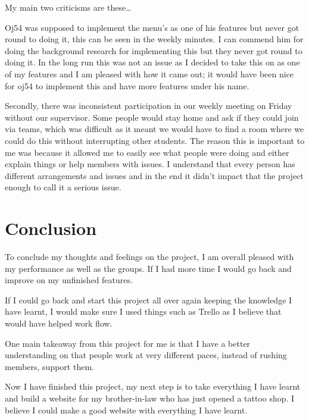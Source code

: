 \documentclass[twoside,12pt,titlepage,a4paper]{article}
\begin{document}
My main two criticisms are these…

Oj54 was supposed to implement the menu’s as one of his features but never got round to doing it, this can be 
seen in the weekly minutes. I can commend him for doing the background research for implementing this but they
never got round to doing it. In the long run this was not an issue as I decided to take this on as one of my 
features and I am pleased with how it came out; it would have been nice for oj54 to implement this and have 
more features under his name.

Secondly, there was inconsistent participation in our weekly meeting on Friday without our supervisor. Some 
people would stay home and ask if they could join via teams, which was difficult as it meant we would have to 
find a room where we could do this without interrupting other students. The reason this is important to me was
because it allowed me to easily see what people were doing and either explain things or help members with 
issues. I understand that every person has different arrangements and issues and in the end it didn’t impact 
that the project enough to call it a serious issue.

\section{Conclusion}
\label{Conclusion}
To conclude my thoughts and feelings on the project, I am overall pleased with my performance as well as the 
groups. If I had more time I would go back and improve on my unfinished features.

If I could go back and start this project all over again keeping the knowledge I have learnt, I would make sure
I used things such as Trello as I believe that would have helped work flow.

One main takeaway from this project for me is that I have a better understanding on that people work at very 
different paces, instead of rushing members, support them.

Now I have finished this project, my next step is to take everything I have learnt and build a website for my 
brother-in-law who has just opened a tattoo shop. I believe I could make a good website with everything I have
learnt.
\end{document}
